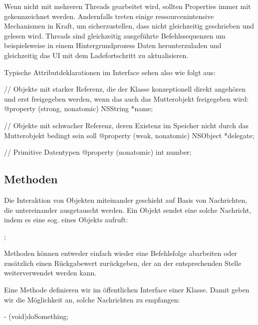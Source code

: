 \documentclass[parskip=half, final]{scrreprt}
\begin{document}
Wenn nicht mit mehreren Threads gearbeitet wird, sollten Properties immer mit  gekennzeichnet werden. Andernfalls treten einige ressourcenintensive Mechanismen in Kraft, um sicherzustellen, dass nicht gleichzeitig geschrieben und gelesen wird. Threads sind gleichzeitig ausgeführte Befehlssequenzen um beispielsweise in einem Hintergrundprozess Daten herunterzuladen und gleichzeitig das UI mit dem Ladefortschritt zu aktualisieren.

Typische Attributdeklarationen im Interface sehen also wie folgt aus:

\begin{objclst}
// Objekte mit starker Referenz, die der Klasse konzeptionell direkt angehören und erst freigegeben werden, wenn das auch das Mutterobjekt freigegeben wird:
@property (strong, nonatomic) NSString *name;
\end{objclst}

\begin{objclst}
// Objekte mit schwacher Referenz, deren Existenz im Speicher nicht durch das Mutterobjekt bedingt sein soll
@property (weak, nonatomic) NSObject *delegate;
\end{objclst}

\begin{objclst}
// Primitive Datentypen
@property (nonatomic) int number;
\end{objclst}

\subsection{Methoden}\label{sec:methoden}

Die Interaktion von Objekten miteinander geschieht auf Basis von Nachrichten, die untereinander ausgetauscht werden. Ein Objekt  sendet eine solche Nachricht, indem es eine sog.   eines Objekts  aufruft:
\begin{objclst}
;
\end{objclst}

Methoden können entweder einfach wieder eine Befehlsfolge abarbeiten oder zusätzlich einen Rückgabewert zurückgeben, der an der entsprechenden Stelle weiterverwendet werden kann.

Eine Methode definieren wir im öffentlichen Interface einer Klasse. Damit geben wir die Möglichkeit an, solche Nachrichten zu empfangen:
\begin{objclst}
- (void)doSomething;
\end{objclst}
\end{document}
